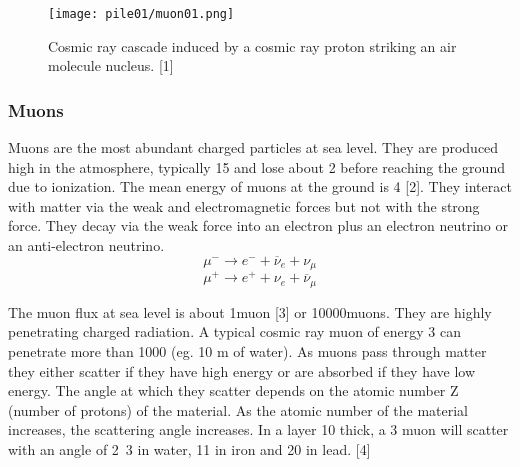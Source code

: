 \documentclass[a4paper]{article}
\begin{document}
\begin{figure}[h!]
  \texttt{[image: pile01/muon01.png]}
  \caption{Cosmic ray cascade induced by a cosmic ray proton striking
an air molecule nucleus. [1]}
\end{figure}

\subsubsection{Muons}
Muons are the most abundant charged particles at sea level. They are produced high in the
atmosphere, typically \unit{15}{\kilo\metre} and lose about \unit{2}{\giga\electronvolt} before reaching the ground due to ionization. The
mean energy of muons at the ground is \unit{4}{\giga\electronvolt} [2]. They interact with matter via the weak and
electromagnetic forces but not with the strong force. They decay via the weak force into an electron
plus an electron neutrino or an anti-electron neutrino.
\begin{equation} \mu^- \rightarrow e^- + \overline{\nu}_e + \nu_\mu \end{equation}
\begin{equation} \mu^+ \rightarrow e^+ + \nu_e + \overline{\nu}_\mu \end{equation}

The muon flux at sea level is about \unit{1}{muon\usk\rpsquare{\centi\metre}\usk\reciprocal\minute} [3] or 
\unit{10000}{muons\usk\rpsquare\metre\usk\reciprocal\minute}. They are highly penetrating charged radiation. 
A typical cosmic ray muon of energy \unit{3}{\giga\electronvolt} can penetrate more than 
\unit{1000}{\gram\usk\rpsquare{\centi\metre}} (eg. 10 m of water). As muons pass through matter they either
scatter if they have high energy or are absorbed if they have low energy. The angle at which they
scatter depends on the atomic number Z (number of protons) of the material. As the atomic number
of the material increases, the scattering angle increases. In a layer \unit{10}{\centi\metre} thick, a 
\unit{3}{\giga\electronvolt} muon will scatter with an angle of \unit{2.3}{\milli\radian} in water, 
\unit{11}{\milli\radian} in iron and \unit{20}{\milli\radian} in lead. [4]
\end{document}
